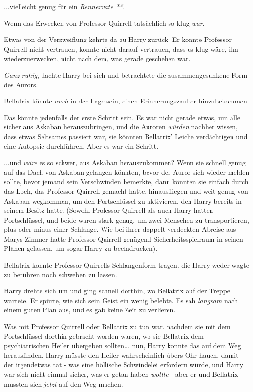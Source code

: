 {...vielleicht genug für ein \emph{Rennervate **}.

Wenn das Erwecken von Professor Quirrell tatsächlich so klug \emph{war}.

Etwas von der Verzweiflung kehrte da zu Harry zurück. Er konnte Professor Quirrell nicht vertrauen, konnte nicht darauf vertrauen, dass es klug wäre, ihn wiederzuerwecken, nicht nach dem, was gerade geschehen war.

\emph{Ganz ruhig}, dachte Harry bei sich und betrachtete die zusammengesunkene Form des Aurors.

Bellatrix könnte \emph{auch} in der Lage sein, einen Erinnerungszauber hinzubekommen.

Das könnte jedenfalls der erste Schritt sein. Es war nicht gerade etwas, um alle sicher aus Askaban herauszubringen, und die Auroren \emph{würden} nachher wissen, dass etwas Seltsames passiert war, sie könnten Bellatrix' Leiche verdächtigen und eine Autopsie durchführen. Aber es war ein Schritt.

...und \emph{wäre} es so schwer, aus Askaban herauszukommen? Wenn sie schnell genug auf das Dach von Askaban gelangen könnten, bevor der Auror sich wieder melden sollte, bevor jemand sein Verschwinden bemerkte, dann könnten sie einfach durch das Loch, das Professor Quirrell gemacht hatte, hinausfliegen und weit genug von Askaban wegkommen, um den Portschlüssel zu aktivieren, den Harry bereits in seinem Besitz hatte. (Sowohl Professor Quirrell als auch Harry hatten Portschlüssel, und beide waren stark genug, um zwei Menschen zu transportieren, plus oder minus einer Schlange. Wie bei ihrer doppelt verdeckten Abreise aus Marys Zimmer hatte Professor Quirrell genügend Sicherheitsspielraum in seinen Plänen gelassen, um sogar Harry zu beeindrucken).

Bellatrix konnte Professor Quirrells Schlangenform tragen, die Harry weder wagte zu berühren noch schweben zu lassen.

Harry drehte sich um und ging schnell dorthin, wo Bellatrix auf der Treppe wartete. Er spürte, wie sich sein Geist ein wenig belebte. Es sah \emph{langsam} nach einem guten Plan aus, und es gab keine Zeit zu verlieren.

Was mit Professor Quirrell oder Bellatrix zu tun war, nachdem sie mit dem Portschlüssel dorthin gebracht worden waren, wo sie Bellatrix dem psychiatrischen Heiler übergeben sollten... nun, Harry konnte das auf dem Weg herausfinden. Harry müsste den Heiler wahrscheinlich übers Ohr hauen, damit der irgendetwas tat - was eine höllische Schwindelei erfordern würde, und Harry war sich nicht einmal sicher, was er getan haben \emph{wollte} - aber er und Bellatrix mussten sich \emph{jetzt} auf den Weg machen.

}

